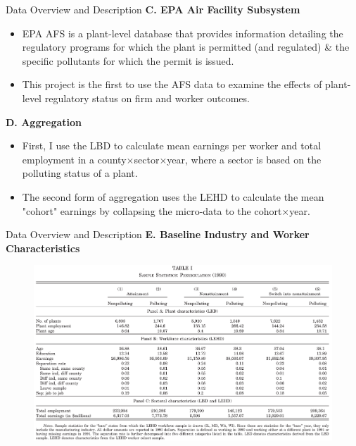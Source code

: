 \documentclass{beamer}
\begin{document}
\begin{frame}{Data Overview and Description}
	\textbf{C. EPA Air Facility Subsystem}
	\begin{itemize}
		\item EPA AFS is a plant-level database that provides information detailing the regulatory programs for which the plant is permitted (and regulated) \& the specific pollutants for which the permit is issued.
		\item This project is the first to use the AFS data to examine the effects of plant-level regulatory status on firm and worker outcomes.
	\end{itemize}
	\textbf{D. Aggregation}
	\begin{itemize}
		\item First, I use the LBD to calculate mean earnings per worker and total employment in a county$\times$sector$\times$year, where a sector is based on the polluting status of a plant.
		\item The second form of aggregation uses the LEHD to calculate the mean "cohort" earnings by collapsing the micro-data to the cohort$\times$year.
	\end{itemize}
\end{frame}
\begin{frame}{Data Overview and Description}
	\textbf{E. Baseline Industry and Worker Characteristics}
	\begin{figure}[h]
		\centering
		\includegraphics[scale=0.35]{table1.png}
	\end{figure}
\end{frame}
\end{document}
